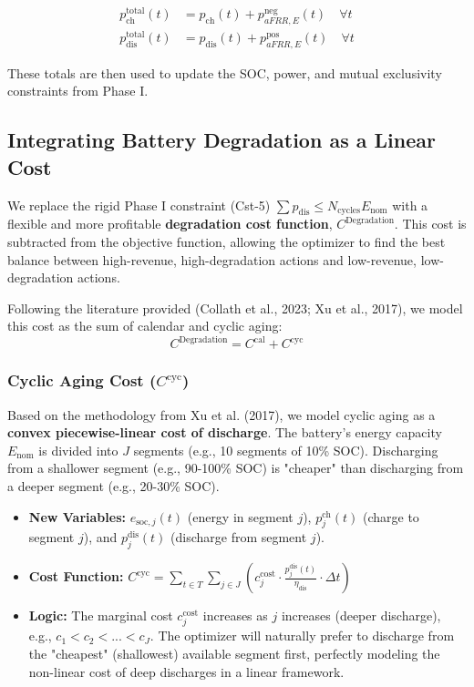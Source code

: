\documentclass[11pt, a4paper]{article}
\begin{document}
\begin{align}
p^{\mathrm{total}}_{\mathrm{ch}}(t) &= p_{\mathrm{ch}}(t) + p^{\mathrm{neg}}_{aFRR,E}(t) \quad \forall t \\
p^{\mathrm{total}}_{\mathrm{dis}}(t) &= p_{\mathrm{dis}}(t) + p^{\mathrm{pos}}_{aFRR,E}(t) \quad \forall t 
\end{align}

These totals are then used to update the SOC, power, and mutual exclusivity constraints from Phase I.

\subsection{Integrating Battery Degradation as a Linear Cost}
We replace the rigid Phase I constraint (Cst-5) $\sum p_{\mathrm{dis}} \le N_{\mathrm{cycles}} E_{\mathrm{nom}}$ with a flexible and more profitable \textbf{degradation cost function}, $C^{\mathrm{Degradation}}$. This cost is subtracted from the objective function, allowing the optimizer to find the best balance between high-revenue, high-degradation actions and low-revenue, low-degradation actions.

Following the literature provided (Collath et al., 2023; Xu et al., 2017), we model this cost as the sum of calendar and cyclic aging:
$$ C^{\mathrm{Degradation}} = C^{\mathrm{cal}} + C^{\mathrm{cyc}} $$

\subsubsection{Cyclic Aging Cost ($C^{\mathrm{cyc}}$)}
Based on the methodology from Xu et al. (2017), we model cyclic aging as a \textbf{convex piecewise-linear cost of discharge}. The battery's energy capacity $E_{\mathrm{nom}}$ is divided into $J$ segments (e.g., 10 segments of 10\% SOC). Discharging from a shallower segment (e.g., 90-100\% SOC) is "cheaper" than discharging from a deeper segment (e.g., 20-30\% SOC).
\begin{itemize}
    \item \textbf{New Variables:} $e_{\mathrm{soc},j}(t)$ (energy in segment $j$), $p^{\mathrm{ch}}_{j}(t)$ (charge to segment $j$), and $p^{\mathrm{dis}}_{j}(t)$ (discharge from segment $j$).
    \item \textbf{Cost Function:} $C^{\mathrm{cyc}} = \sum_{t \in T} \sum_{j \in J} \left( c^{\mathrm{cost}}_{j} \cdot \frac{p^{\mathrm{dis}}_{j}(t)}{\eta_{\mathrm{dis}}} \cdot \Delta t \right)$
    \item \textbf{Logic:} The marginal cost $c^{\mathrm{cost}}_{j}$ increases as $j$ increases (deeper discharge), e.g., $c_1 < c_2 < ... < c_J$. The optimizer will naturally prefer to discharge from the "cheapest" (shallowest) available segment first, perfectly modeling the non-linear cost of deep discharges in a linear framework.
\end{itemize}
\end{document}
